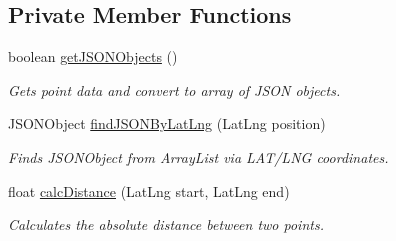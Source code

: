 \subsection*{Private Member Functions}
\begin{DoxyCompactItemize}
\item 
boolean \hyperlink{classcom_1_1jack_1_1motorbikestatistics_1_1_maps_activity_a0c72fcb79424420c3477add9ba6ab447}{get\+J\+S\+O\+N\+Objects} ()
\begin{DoxyCompactList}\small\item\em Gets point data and convert to array of J\+S\+ON objects. \end{DoxyCompactList}\item 
J\+S\+O\+N\+Object \hyperlink{classcom_1_1jack_1_1motorbikestatistics_1_1_maps_activity_ae5478e56dfb617433d0dfaeb94a403c7}{find\+J\+S\+O\+N\+By\+Lat\+Lng} (Lat\+Lng position)
\begin{DoxyCompactList}\small\item\em Finds J\+S\+O\+N\+Object from Array\+List via L\+A\+T/\+L\+NG coordinates. \end{DoxyCompactList}\item 
float \hyperlink{classcom_1_1jack_1_1motorbikestatistics_1_1_maps_activity_af4feb7617c02a59c62d6e9257914e997}{calc\+Distance} (Lat\+Lng start, Lat\+Lng end)
\begin{DoxyCompactList}\small\item\em Calculates the absolute distance between two points. \end{DoxyCompactList}\end{DoxyCompactItemize}
